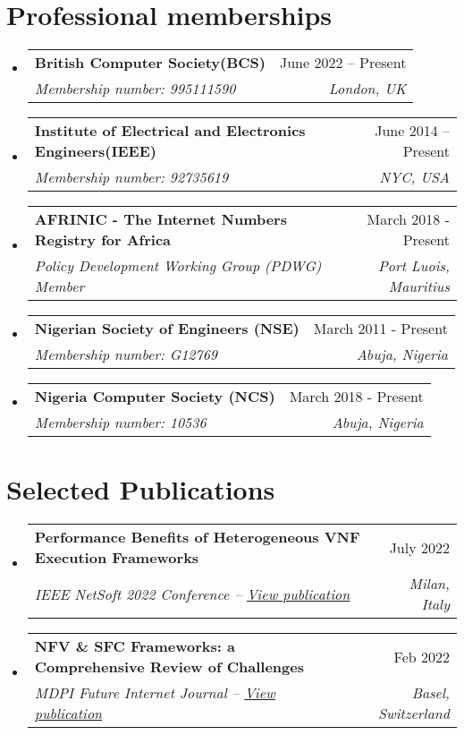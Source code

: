 \documentclass[letterpaper,11pt]{article}
\makeatletter
\newcommand{\resumeSubheading}[4]{
  \vspace{-2pt}\item
    \begin{tabular*}{0.97\textwidth}[t]{l@{\extracolsep{\fill}}r}
      \textbf{#1} & #2 \\
      \textit{\small#3} & \textit{\small #4} \\
    \end{tabular*}\vspace{-7pt}
}
\newcommand{\resumeSubHeadingListStart}{\begin{itemize}[leftmargin=0.15in, label={}]}
\newcommand{\resumeSubHeadingListEnd}{\end{itemize}}
\newcommand{\resumeItemListStart}{\begin{itemize}}
\newcommand{\resumeItemListEnd}{\end{itemize}\vspace{-5pt}}
\makeatother
\begin{document}
\section{\textbf{Professional memberships}}
  \resumeSubHeadingListStart

    \resumeSubheading
      {British Computer Society(BCS)}{June 2022 – Present}
      {Membership number: 995111590}{London, UK}
    \resumeSubheading
      {Institute of Electrical and Electronics Engineers(IEEE)}{June 2014 – Present}
      {Membership number: 92735619}{NYC, USA}
    
    \resumeSubheading{AFRINIC - The Internet Numbers Registry for Africa}{March 2018 - Present}
    { Policy Development Working Group (PDWG) Member}{Port Luois, Mauritius}
    
    \resumeSubheading{Nigerian Society of Engineers (NSE)}{March 2011 - Present}
    {Membership number: G12769}{Abuja, Nigeria}
     
    \resumeSubheading{Nigeria Computer Society (NCS)}{March 2018 - Present}
    {Membership number: 10536}{Abuja, Nigeria}

    \resumeSubHeadingListEnd




\section{\textbf{Selected Publications}}
  \resumeSubHeadingListStart

    \resumeSubheading
      {Performance Benefits of Heterogeneous VNF Execution Frameworks}{July 2022}
      {IEEE NetSoft 2022 Conference --     \href{https://eprints.gla.ac.uk/270458/}{\underline{View publication}}}{Milan, Italy}
   
   
    \resumeSubheading
      {NFV \& SFC Frameworks: a Comprehensive Review of Challenges}{Feb 2022}
      {MDPI Future Internet Journal --     \href{https://www.mdpi.com/1999-5903/14/2/59}{\underline{View publication}}}{Basel, Switzerland}
      \resumeItemListStart
     
      \resumeItemListEnd
      
     
    \resumeSubHeadingListEnd



\end{document}
